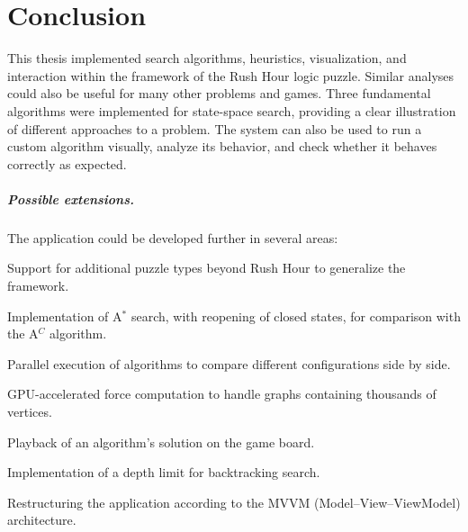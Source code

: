 \chapter{Conclusion}
\label{ch:sum}

This thesis implemented search algorithms, heuristics, visualization, and interaction within the framework of the Rush Hour logic puzzle. Similar analyses could also be useful for many other problems and games.
Three fundamental algorithms were implemented for state-space search, providing a clear illustration of different approaches to a problem. The system can also be used to run a custom algorithm visually, analyze its behavior, and check whether it behaves correctly as expected.

\paragraph{Possible extensions.} The application could be developed further in several areas:
\begin{compactitem}
\item Support for additional puzzle types beyond Rush Hour to generalize the framework.
\item Implementation of A$^*$ search, with reopening of closed states, for comparison with the A$^C$ algorithm.
\item Parallel execution of algorithms to compare different configurations side by side.
\item GPU-accelerated force computation to handle graphs containing thousands of vertices.
\item Playback of an algorithm's solution on the game board.
\item Implementation of a depth limit for backtracking search.
\item Restructuring the application according to the MVVM (Model--View--ViewModel) architecture.
\end{compactitem}
